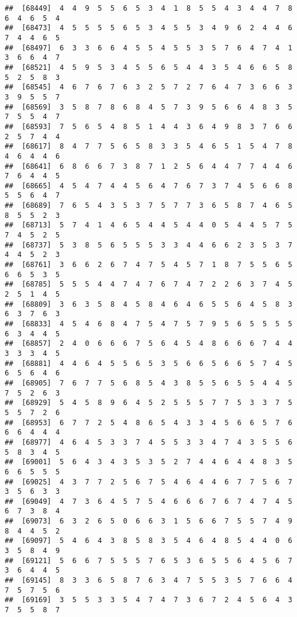 \documentclass[
]{book}
\begin{document}
\begin{verbatim}
##  [68449]  4  4  9  5  5  6  5  3  4  1  8  5  5  4  3  4  4  7  8  6  4  6  5  4
##  [68473]  4  5  5  5  5  6  5  3  4  5  5  3  4  9  6  2  4  4  6  7  4  4  6  5
##  [68497]  6  3  3  6  6  4  5  5  4  5  5  3  5  7  6  4  7  4  1  3  6  6  4  7
##  [68521]  4  5  9  5  3  4  5  5  6  5  4  4  3  5  4  6  6  5  8  5  2  5  8  3
##  [68545]  4  6  7  6  7  6  3  2  5  7  2  7  6  4  7  3  6  6  3  3  9  5  5  7
##  [68569]  3  5  8  7  8  6  8  4  5  7  3  9  5  6  6  4  8  3  5  7  5  5  4  7
##  [68593]  7  5  6  5  4  8  5  1  4  4  3  6  4  9  8  3  7  6  6  2  5  7  4  4
##  [68617]  8  4  7  7  5  6  5  8  3  3  5  4  6  5  1  5  4  7  8  4  6  4  4  6
##  [68641]  6  8  6  6  7  3  8  7  1  2  5  6  4  4  7  7  4  4  6  7  6  4  4  5
##  [68665]  4  5  4  7  4  4  5  6  4  7  6  7  3  7  4  5  6  6  8  5  5  6  4  7
##  [68689]  7  6  5  4  3  5  3  7  5  7  7  3  6  5  8  7  4  6  5  8  5  5  2  3
##  [68713]  5  7  4  1  4  6  5  4  4  5  4  4  0  5  4  4  5  7  5  7  4  5  2  5
##  [68737]  5  3  8  5  6  5  5  5  3  3  4  4  6  6  2  3  5  3  7  4  4  5  2  3
##  [68761]  3  6  6  2  6  7  4  7  5  4  5  7  1  8  7  5  5  6  5  6  6  5  3  5
##  [68785]  5  5  5  4  4  7  4  7  6  7  4  7  2  2  6  3  7  4  5  2  5  1  4  5
##  [68809]  3  6  3  5  8  4  5  8  4  6  4  6  5  5  6  4  5  8  3  6  3  7  6  3
##  [68833]  4  5  4  6  8  4  7  5  4  7  5  7  9  5  6  5  5  5  5  6  3  4  4  5
##  [68857]  2  4  0  6  6  6  7  5  6  4  5  4  8  6  6  6  7  4  4  3  3  3  4  5
##  [68881]  4  4  6  4  5  5  6  5  3  5  6  6  5  6  6  5  7  4  5  6  5  6  4  6
##  [68905]  7  6  7  7  5  6  8  5  4  3  8  5  5  6  5  5  4  4  5  7  5  2  6  3
##  [68929]  5  4  5  8  9  6  4  5  2  5  5  5  7  7  5  3  3  7  5  5  5  7  2  6
##  [68953]  6  7  7  2  5  4  8  6  5  4  3  3  4  5  6  6  5  7  6  6  6  4  4  4
##  [68977]  4  6  4  5  3  3  7  4  5  5  3  3  4  7  4  3  5  5  6  5  8  3  4  5
##  [69001]  5  6  4  3  4  3  5  3  5  2  7  4  4  6  4  4  8  3  5  6  6  5  5  5
##  [69025]  4  3  7  7  2  5  6  7  5  4  6  4  4  6  7  7  5  6  7  3  5  6  3  3
##  [69049]  4  7  3  6  4  5  7  5  4  6  6  6  7  6  7  4  7  4  5  6  7  3  8  4
##  [69073]  6  3  2  6  5  0  6  6  3  1  5  6  6  7  5  5  7  4  9  8  4  4  5  2
##  [69097]  5  4  6  4  3  8  5  8  3  5  4  6  4  8  5  4  4  0  6  3  5  8  4  9
##  [69121]  5  6  6  7  5  5  5  7  6  5  3  6  5  5  6  4  5  6  7  3  6  4  4  5
##  [69145]  8  3  3  6  5  8  7  6  3  4  7  5  5  3  5  7  6  6  4  7  5  7  5  6
##  [69169]  3  5  5  3  3  5  4  7  4  7  3  6  7  2  4  5  6  4  3  7  5  5  8  7

\end{verbatim}
\end{document}

